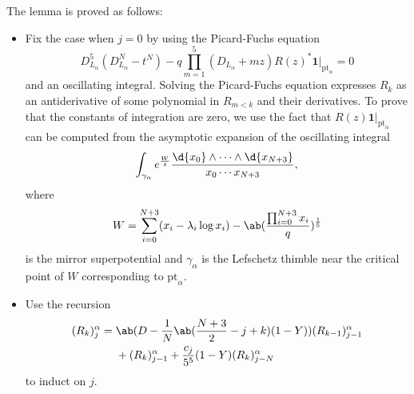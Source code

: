 \documentclass[10pt]{amsart}
\theoremstyle{definition}
\theoremstyle{remark}
\theoremstyle{plain}
\theoremstyle{definition}
\theoremstyle{remark}
\newcommand{\mr}[1]{\mathrm{#1}}
\newcommand{\1}{\mathbf{1}}
\newcommand{\2}{\mathbf{2}}
\newcommand{\3}{\mathbf{3}}
\newcommand{\pt}{\mr{pt}}
\begin{document}
The lemma is proved as follows:
\begin{itemize}
    \item Fix the case when $j=0$ by using the Picard-Fuchs equation
        \[ D_{L_{\alpha}}^5 (D_{L_{\alpha}}^N - t^N) - q \prod_{m=1}^5 (D_{L_{\alpha}} + mz) R(z)^* \1|_{\pt_{\alpha}} = 0 \]
        and an oscillating integral. Solving the Picard-Fuchs equation expresses $R_k$ as an antiderivative of some polynomial in $R_{m < k}$ and their derivatives. To prove that the constants of integration are zero, we use the fact that $R(z)\1 |_{\pt_{\alpha}}$ can be computed from the asymptotic expansion of the oscillating integral
        \[ \int_{\gamma_{\alpha}} e^{\frac{W}{z}} \frac{\d{x_0} \wedge \cdots \wedge \d{x_{N+3}}}{x_0 \cdots x_{N+3}}, \]
        where
        \[ W = \sum_{i=0}^{N+3} (x_i - \lambda_i \log x_i) - \ab( \frac{\prod_{i=0}^{N+3}x_i}{q} )^{\frac{1}{5}} \]
        is the mirror superpotential and $\gamma_{\alpha}$ is the Lefschetz thimble near the critical point of $W$ corresponding to $\pt_{\alpha}$.
    \item Use the recursion
        \begin{align*}
            (R_k)_j^{\alpha} ={}& \ab(D - \frac{1}{N}\ab(\frac{N+3}{2} - j+k)(1-Y)) (R_{k-1})_{j-1}^{\alpha} \\
            &+ (R_k)_{j-1}^{\alpha} + \frac{c_j}{5^5}(1-Y) (R_k)_{j-N}^{\alpha}
        \end{align*}
        to induct on $j$.
\end{itemize}
\end{document}

